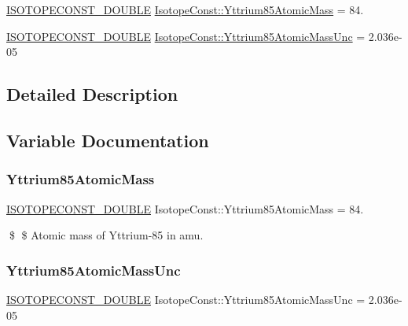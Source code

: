 \begin{DoxyCompactItemize}
\item 
\mbox{\hyperlink{group___isotope_const-_macros_ga8f45a7272ce02c0b4c65c44636ed719a}{I\+S\+O\+T\+O\+P\+E\+C\+O\+N\+S\+T\+\_\+\+D\+O\+U\+B\+LE}} \mbox{\hyperlink{group___isotope_const-_yttrium-_y85_ga79c2a0549733d72138c7c3016690a19f}{Isotope\+Const\+::\+Yttrium85\+Atomic\+Mass}} = 84.
\item 
\mbox{\hyperlink{group___isotope_const-_macros_ga8f45a7272ce02c0b4c65c44636ed719a}{I\+S\+O\+T\+O\+P\+E\+C\+O\+N\+S\+T\+\_\+\+D\+O\+U\+B\+LE}} \mbox{\hyperlink{group___isotope_const-_yttrium-_y85_ga6d8e9789e6144e010936893f5dc5fac6}{Isotope\+Const\+::\+Yttrium85\+Atomic\+Mass\+Unc}} = 2.\+036e-\/05
\end{DoxyCompactItemize}


\subsection{Detailed Description}


\subsection{Variable Documentation}
\mbox{\label{group___isotope_const-_yttrium-_y85_ga79c2a0549733d72138c7c3016690a19f}} 
\subsubsection{\texorpdfstring{Yttrium85\+Atomic\+Mass}{Yttrium85AtomicMass}}
{\footnotesize\ttfamily \mbox{\hyperlink{group___isotope_const-_macros_ga8f45a7272ce02c0b4c65c44636ed719a}{I\+S\+O\+T\+O\+P\+E\+C\+O\+N\+S\+T\+\_\+\+D\+O\+U\+B\+LE}} Isotope\+Const\+::\+Yttrium85\+Atomic\+Mass = 84.}

\$ \$ Atomic mass of Yttrium-\/85 in amu. \mbox{\label{group___isotope_const-_yttrium-_y85_ga6d8e9789e6144e010936893f5dc5fac6}} 
\subsubsection{\texorpdfstring{Yttrium85\+Atomic\+Mass\+Unc}{Yttrium85AtomicMassUnc}}
{\footnotesize\ttfamily \mbox{\hyperlink{group___isotope_const-_macros_ga8f45a7272ce02c0b4c65c44636ed719a}{I\+S\+O\+T\+O\+P\+E\+C\+O\+N\+S\+T\+\_\+\+D\+O\+U\+B\+LE}} Isotope\+Const\+::\+Yttrium85\+Atomic\+Mass\+Unc = 2.\+036e-\/05}

